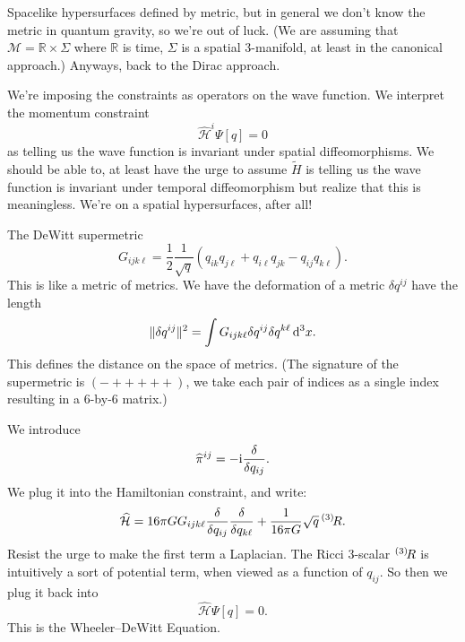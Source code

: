 \lecture

Spacelike hypersurfaces defined by metric, but in general we don't know
the metric in quantum gravity, so we're out of luck. (We are assuming
that $\mathcal{M}=\mathbb{R}\times\Sigma$ where $\mathbb{R}$ is time,
$\Sigma$ is a spatial 3-manifold, at least in the canonical approach.)
Anyways, back to the Dirac approach.

We're imposing the constraints as operators on the wave function. We
interpret the momentum constraint
\begin{equation}
\widehat{\mathcal{H}}^{i}\Psi[q] = 0
\end{equation}
as telling us the wave function is invariant under spatial
diffeomorphisms. We should be able to, at least have the urge to assume
$\widetilde{H}$ is telling us the wave function is invariant under
temporal diffeomorphism but realize that this is meaningless. We're on a
spatial hypersurfaces, after all!

The DeWitt supermetric
\begin{equation}
G_{ijk\ell} = \frac{1}{2}\frac{1}{\sqrt{q}}(q_{ik}q_{j\ell} +
q_{i\ell}q_{jk} - q_{ij}q_{k\ell}).
\end{equation}
This is like a metric of metrics. We have the deformation of a metric
$\delta q^{ij}$ have the length
\begin{equation}
\|\delta q^{ij}\|^{2} = \int G_{ijk\ell}\delta q^{ij}\delta q^{k\ell}\,\mathrm{d}^{3}x.
\end{equation}
This defines the distance on the space of metrics. (The signature of the
supermetric is $(-+++++)$, we take each pair of indices as a single
index resulting in a 6-by-6 matrix.)

We introduce
\begin{equation}
\widehat{\pi}^{ij}=-\mathrm{i}\frac{\delta}{\delta q_{ij}}.
\end{equation}
We plug it into the Hamiltonian constraint, and write:
\begin{equation}
\widehat{\mathcal{H}} = 16\pi G G_{ijk\ell}\frac{\delta}{\delta q_{ij}}\frac{\delta}{\delta q_{k\ell}}
+\frac{1}{16\pi G}\sqrt{q}\,{{}^{(3)}\!R}.
\end{equation}
Resist the urge to make the first term a Laplacian. The Ricci 3-scalar
${{}^{(3)}\!R}$ is intuitively a sort of potential term, when viewed as a
function of $q_{ij}$. So then we plug it back into
\begin{equation}
\widehat{\mathcal{H}}\Psi[q]=0.
\end{equation}
This is the Wheeler--DeWitt Equation.

